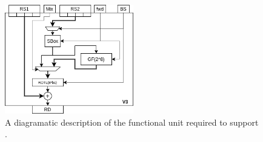 \vspace*{\fill}


\newpage

\vspace*{\fill}

\begin{figure}[!h]
\centering
\includegraphics[width={0.5\textwidth}]{diagrams/ise-datapath-v3.png}
\caption{
  A diagramatic description of the functional unit required to support .
}
\label{fig:v3:fu}
\end{figure}

\vspace*{\fill}

